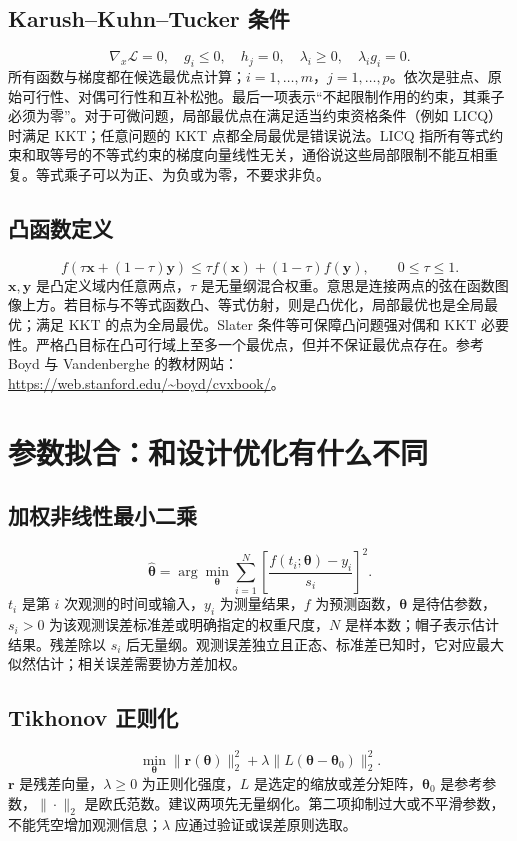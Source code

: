 \documentclass[UTF8,zihao=-4,openany,oneside,fontset=windows]{ctexbook}
\begin{document}
\subsection{Karush--Kuhn--Tucker 条件}
\begin{equation}\nabla_x\mathcal L=0,\quad g_i\le0,\quad h_j=0,\quad\lambda_i\ge0,\quad\lambda_i g_i=0.\end{equation}
所有函数与梯度都在候选最优点计算；$i=1,\ldots,m$，$j=1,\ldots,p$。依次是驻点、原始可行性、对偶可行性和互补松弛。最后一项表示“不起限制作用的约束，其乘子必须为零”。对于可微问题，局部最优点在满足适当约束资格条件（例如 LICQ）时满足 KKT；任意问题的 KKT 点都全局最优是错误说法。LICQ 指所有等式约束和取等号的不等式约束的梯度向量线性无关，通俗说这些局部限制不能互相重复。等式乘子可以为正、为负或为零，不要求非负。
\subsection{凸函数定义}
\begin{equation}f(\tau\boldsymbol x+(1-\tau)\boldsymbol y)\le\tau f(\boldsymbol x)+(1-\tau)f(\boldsymbol y),\qquad 0\le\tau\le1.\end{equation}
$\boldsymbol x,\boldsymbol y$ 是凸定义域内任意两点，$\tau$ 是无量纲混合权重。意思是连接两点的弦在函数图像上方。若目标与不等式函数凸、等式仿射，则是凸优化，局部最优也是全局最优；满足 KKT 的点为全局最优。Slater 条件等可保障凸问题强对偶和 KKT 必要性。严格凸目标在凸可行域上至多一个最优点，但并不保证最优点存在。参考 Boyd 与 Vandenberghe 的教材网站：\url{https://web.stanford.edu/~boyd/cvxbook/}。

\section{参数拟合：和设计优化有什么不同}
\subsection{加权非线性最小二乘}
\begin{equation}\widehat{\boldsymbol\theta}=\arg\min_{\boldsymbol\theta}\sum_{i=1}^N\left[\frac{f(t_i;\boldsymbol\theta)-y_i}{s_i}\right]^2.\end{equation}
$t_i$ 是第 $i$ 次观测的时间或输入，$y_i$ 为测量结果，$f$ 为预测函数，$\boldsymbol\theta$ 是待估参数，$s_i>0$ 为该观测误差标准差或明确指定的权重尺度，$N$ 是样本数；帽子表示估计结果。残差除以 $s_i$ 后无量纲。观测误差独立且正态、标准差已知时，它对应最大似然估计；相关误差需要协方差加权。
\subsection{Tikhonov 正则化}
\begin{equation}\min_{\boldsymbol\theta}\|\boldsymbol r(\boldsymbol\theta)\|_2^2+\lambda\|L(\boldsymbol\theta-\boldsymbol\theta_0)\|_2^2.\end{equation}
$\boldsymbol r$ 是残差向量，$\lambda\ge0$ 为正则化强度，$L$ 是选定的缩放或差分矩阵，$\boldsymbol\theta_0$ 是参考参数，$\|\cdot\|_2$ 是欧氏范数。建议两项先无量纲化。第二项抑制过大或不平滑参数，不能凭空增加观测信息；$\lambda$ 应通过验证或误差原则选取。
\end{document}

